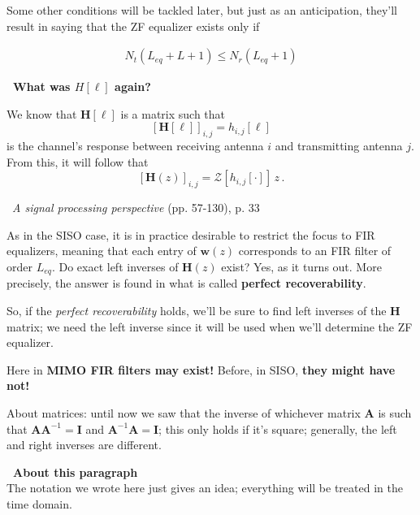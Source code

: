 \documentclass[a4paper, 12pt]{book}
\begin{document}
Some other conditions will be tackled later, but just as an anticipation, they'll result in saying that the ZF equalizer exists only if

\begin{align}
    N_t(L_{eq} + L + 1) \leq N_r(L_{eq} + 1) \tag{2.146+}
\end{align}

\begin{tcolorbox}[colback=obsidianPurple, colframe=white, boxrule=0pt, sharp corners]
    \textcolor{obsidianTextPurple}{\textbf{\faBook\ What was $H[\ell]$ again?}}
    
    We know that $\mathbf{H}[\ell]$ is a matrix such that
    \[ [\boldsymbol{H}[\ell]]_{i,j} = h_{i,j}[\ell] \]
    is the channel's response between receiving antenna $i$ and transmitting antenna $j$.\\
    From this, it will follow that
    \[ [\mathbf{H}(z)]_{i,j} = \mathcal{Z}[h_{i,j}[\cdot]] \, z \,. \]
\end{tcolorbox}

\begin{tcolorbox}[colback=obsidianYellow, colframe=white, boxrule=0pt, sharp corners]
    \textcolor{obsidianTextYellow}{\small \faQuoteLeft\ \textit{A signal processing perspective} (pp. 57-130), p. 33}
    
    As in the SISO case, it is in practice desirable to restrict the focus to FIR equalizers, meaning that each entry of $\mathbf{w}(z)$ corresponds to an FIR filter of order $L_{eq}$. Do exact left inverses of $\mathbf{H}(z)$ exist? Yes, as it turns out. More precisely, the answer is found in what is called \textbf{perfect recoverability}.
\end{tcolorbox}

So, if the \textit{perfect recoverability} holds, we'll be sure to find left inverses of the $\mathbf{H}$ matrix; we need the left inverse since it will be used when we'll determine the ZF equalizer.

Here in \textbf{MIMO FIR filters may exist!} Before, in SISO, \textbf{they might have not!}

About matrices: until now we saw that the inverse of whichever matrix $\boldsymbol{A}$ is such that $\boldsymbol{A}\boldsymbol{A}^{-1} = \boldsymbol{I}$ and $\boldsymbol{A}^{-1}\boldsymbol{A} = \boldsymbol{I}$; this only holds if it's square; generally, the left and right inverses are different.

\begin{tcolorbox}[colback=obsidianPurple, colframe=obsidianBorderPurple, boxrule=1pt, rounded corners]
    \textcolor{obsidianTextPurple}{\textbf{\faExclamationCircle\ About this paragraph}}\\
    \footnotesize
    The notation we wrote here just gives an idea; everything will be treated in the time domain.
\end{tcolorbox}
\end{document}

